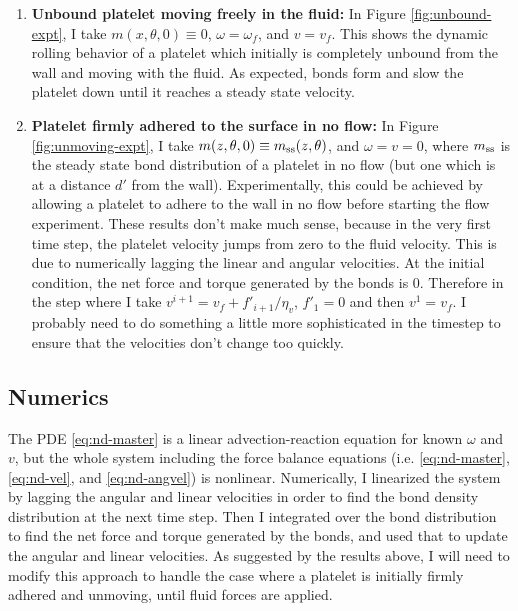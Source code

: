 \documentclass{article}
\newcommand{\tn}{\textnormal}
\begin{document}
\begin{enumerate}
\item \textbf{Unbound platelet moving freely in the fluid:} In Figure
  \ref{fig:unbound-expt}, I take $m(x, \theta, 0) \equiv 0$, $\omega =
  \omega_f$, and $v = v_f$. This shows the dynamic rolling behavior of
  a platelet which initially is completely unbound from the wall and
  moving with the fluid. As expected, bonds form and slow the platelet
  down until it reaches a steady state velocity. 
\item \textbf{Platelet firmly adhered to the surface in no flow:} In
  Figure \ref{fig:unmoving-expt}, I take $m(z, \theta, 0) \equiv
  m_\tn{ss}(z, \theta)$, and $\omega = v = 0$, where $m_\tn{ss}$ is
  the steady state bond distribution of a platelet in no flow (but one
  which is at a distance $d'$ from the wall). Experimentally, this
  could be achieved by allowing a platelet to adhere to the wall in no
  flow before starting the flow experiment. These results don't make
  much sense, because in the very first time step, the platelet
  velocity jumps from zero to the fluid velocity. This is due to
  numerically lagging the linear and angular velocities. At the
  initial condition, the net force and torque generated by the bonds
  is 0. Therefore in the step where I take $v^{i+1} = v_f + f'_{i+1} /
  \eta_v$, $f'_1 = 0$ and then $v^1 = v_f$. I probably need to do
  something a little more sophisticated in the timestep to ensure that
  the velocities don't change too quickly.
\end{enumerate}

\subsection{Numerics}
\label{sec:numerics}

The PDE \eqref{eq:nd-master} is a linear advection-reaction equation
for known $\omega$ and $v$, but the whole system including the force
balance equations (i.e. \eqref{eq:nd-master}, \eqref{eq:nd-vel}, and
\eqref{eq:nd-angvel}) is nonlinear. Numerically, I linearized the
system by lagging the angular and linear velocities in order to find
the bond density distribution at the next time step. Then I integrated
over the bond distribution to find the net force and torque generated
by the bonds, and used that to update the angular and linear
velocities. As suggested by the results above, I will need to modify
this approach to handle the case where a platelet is initially firmly
adhered and unmoving, until fluid forces are applied.
\end{document}
